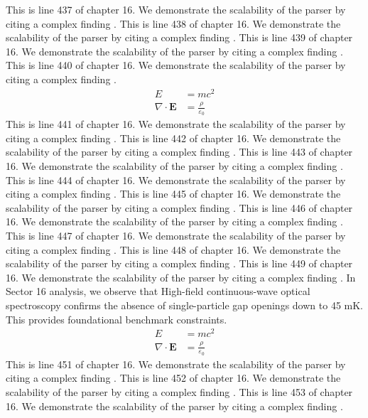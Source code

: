 This is line 437 of chapter 16. We demonstrate the scalability of the parser by citing a complex finding \cite{ref16_437}.
This is line 438 of chapter 16. We demonstrate the scalability of the parser by citing a complex finding \cite{ref16_438}.
This is line 439 of chapter 16. We demonstrate the scalability of the parser by citing a complex finding \cite{ref16_439}.
This is line 440 of chapter 16. We demonstrate the scalability of the parser by citing a complex finding \cite{ref16_440}.
\begin{align*}
  E &= mc^2 \\
  \nabla \cdot \mathbf{E} &= \frac{\rho}{\varepsilon_0}
\end{align*}
This is line 441 of chapter 16. We demonstrate the scalability of the parser by citing a complex finding \cite{ref16_441}.
This is line 442 of chapter 16. We demonstrate the scalability of the parser by citing a complex finding \cite{ref16_442}.
This is line 443 of chapter 16. We demonstrate the scalability of the parser by citing a complex finding \cite{ref16_443}.
This is line 444 of chapter 16. We demonstrate the scalability of the parser by citing a complex finding \cite{ref16_444}.
This is line 445 of chapter 16. We demonstrate the scalability of the parser by citing a complex finding \cite{ref16_445}.
This is line 446 of chapter 16. We demonstrate the scalability of the parser by citing a complex finding \cite{ref16_446}.
This is line 447 of chapter 16. We demonstrate the scalability of the parser by citing a complex finding \cite{ref16_447}.
This is line 448 of chapter 16. We demonstrate the scalability of the parser by citing a complex finding \cite{ref16_448}.
This is line 449 of chapter 16. We demonstrate the scalability of the parser by citing a complex finding \cite{ref16_449}.
In Sector 16 analysis, we observe that High-field continuous-wave optical spectroscopy confirms the absence of single-particle gap openings down to 45 mK. This provides foundational benchmark constraints.
\begin{align*}
  E &= mc^2 \\
  \nabla \cdot \mathbf{E} &= \frac{\rho}{\varepsilon_0}
\end{align*}
This is line 451 of chapter 16. We demonstrate the scalability of the parser by citing a complex finding \cite{ref16_451}.
This is line 452 of chapter 16. We demonstrate the scalability of the parser by citing a complex finding \cite{ref16_452}.
This is line 453 of chapter 16. We demonstrate the scalability of the parser by citing a complex finding \cite{ref16_453}.
